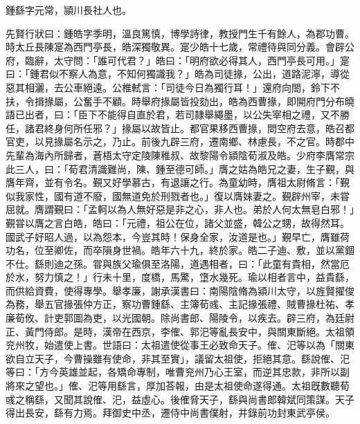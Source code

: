 
\begin{pinyinscope}
鍾繇字元常，頴川長社人也。

先賢行狀曰：鍾皓字季明，溫良篤慎，博學詩律，教授門生千有餘人，為郡功曹。時太丘長陳寔為西門亭長，皓深獨敬異。寔少皓十七歲，常禮待與同分義。會辟公府，臨辭，太守問：「誰可代君？」皓曰：「明府欲必得其人，西門亭長可用。」寔曰：「鍾君似不察人為意，不知何獨識我？」皓為司徒掾，公出，道路泥濘，導從惡其相灑，去公車絕遠。公椎軾言：「司徒今日為獨行耳！」還府向閤，鈴下不扶，令揖掾屬，公奮手不顧。時舉府掾屬皆投劾出，皓為西曹掾，即開府門分布曉語已出者，曰：「臣下不能得自直於君，若司隷舉繩墨，以公失宰相之禮，又不勝任，諸君終身何所任邪？」掾屬以故皆止。都官果移西曹掾，問空府去意，皓召都官吏，以見掾屬名示之，乃止。前後九辟三府，遷南鄉、林慮長，不之官。時郡中先輩為海內所歸者，蒼梧太守定陵陳稚叔、故黎陽令潁陰荀淑及皓。少府李膺常宗此三人，曰：「荀君清識難尚，陳、鍾至德可師。」膺之姑為皓兄之妻，生子覲，與膺年齊，並有令名。覲又好學慕古，有退讓之行。為童幼時，膺祖太尉脩言：「覲似我家性，國有道不廢，國無道免於刑戮者也。」復以膺妹妻之。覲辟州宰，未甞屈就。膺謂覲曰：「孟軻以為人無好惡是非之心，非人也。弟於人何太無皂白邪！」覲甞以膺之言白皓，皓曰：「元禮，祖公在位，諸父並盛，韓公之甥，故得然耳。國武子好昭人過，以為怨本，今豈其時！保身全家，汝道是也。」覲早亡，膺雖荷功名，位至卿佐，而卒隕身世禍。皓年六十九，終於家。皓二子迪、敷，並以黨錮不仕。繇則迪之孫。甞與族父瑜俱至洛陽，道遇相者，曰：「此童有貴相，然當厄於水，努力慎之！」行未十里，度橋，馬驚，墯水幾死。瑜以相者言中，益貴繇，而供給資費，使得專學。舉孝廉，謝承漢書曰：南陽陰脩為潁川太守，以旌賢擢俊為務，舉五官掾張仲方正，察功曹鍾繇、主簿荀彧、主記掾張禮、賊曹掾杜祐、孝廉荀攸、計吏郭圖為吏，以光國朝。除尚書郎、陽陵令，以疾去。辟三府，為廷尉正、黃門侍郎。是時，漢帝在西京，李傕、郭汜等亂長安中，與關東斷絕。太祖領兖州牧，始遣使上書。世語曰：太祖遣使從事王必致命天子。傕、汜等以為「關東欲自立天子，今曹操雖有使命，非其至實」，議留太祖使，拒絕其意。繇說傕、汜等曰：「方今英雄並起，各矯命專制，唯曹兖州乃心王室，而逆其忠款，非所以副將來之望也。」傕、汜等用繇言，厚加荅報，由是太祖使命遂得通。太祖旣數聽荀彧之稱繇，又聞其說傕、汜，益虛心。後傕脅天子，繇與尚書郎韓斌同策謀。天子得出長安，繇有力焉。拜御史中丞，遷侍中尚書僕射，并錄前功封東武亭侯。


\end{pinyinscope}
